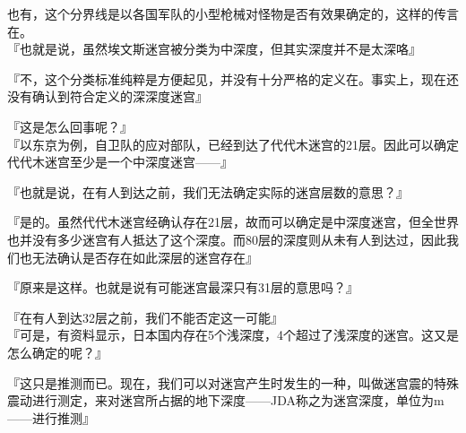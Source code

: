 也有，这个分界线是以各国军队的小型枪械对怪物是否有效果确定的，这样的传言在。\\

『也就是说，虽然埃文斯迷宫被分类为中深度，但其实深度并不是太深咯』

『不，这个分类标准纯粹是方便起见，并没有十分严格的定义在。事实上，现在还没有确认到符合定义的深深度迷宫』

『这是怎么回事呢？』\\

『以东京为例，自卫队的应对部队，已经到达了代代木迷宫的21层。因此可以确定代代木迷宫至少是一个中深度迷宫——』

『也就是说，在有人到达之前，我们无法确定实际的迷宫层数的意思？』

『是的。虽然代代木迷宫经确认存在21层，故而可以确定是中深度迷宫，但全世界也并没有多少迷宫有人抵达了这个深度。而80层的深度则从未有人到达过，因此我们也无法确认是否存在如此深层的迷宫存在』

『原来是这样。也就是说有可能迷宫最深只有31层的意思吗？』

『在有人到达32层之前，我们不能否定这一可能』\\

『可是，有资料显示，日本国内存在5个浅深度，4个超过了浅深度的迷宫。这又是怎么确定的呢？』

『这只是推测而已。现在，我们可以对迷宫产生时发生的一种，叫做迷宫震的特殊震动进行测定，来对迷宫所占据的地下深度——JDA称之为迷宫深度，单位为m——进行推测』

